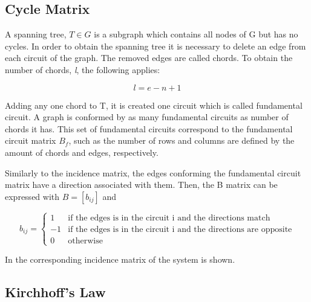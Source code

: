 
\subsection{Cycle Matrix}
\label{CycleSection}
A spanning tree, $T \in G$ is a subgraph which contains all nodes of G but has no cycles. 
In order to obtain the spanning tree it is necessary to delete an edge from each circuit of the graph. The removed edges are called chords. To obtain the number 
of chords, \textit{l}, the following applies:

\begin{equation}
  \label{Numberofchords}
  l = e - n +1
\end{equation}

Adding any one chord to T, it is created one circuit which is called fundamental circuit. A graph is conformed by as many fundamental circuits as number of chords it has.  
This set of fundamental circuits correspond to the fundamental circuit matrix 
$B_f$, such as the number of rows and columns are defined by the amount of chords and edges, respectively. 

Similarly to the incidence matrix, the edges conforming the fundamental circuit 
matrix have a direction associated with them. Then, the B matrix can be 
expressed with $B = [b_{ij}]$ and

\begin{equation}
\label{DiGraphCycle}
 b_{ij} =
		\left\{
		\begin{array}{ll}
		
		1 			&      \text{if the edges is in the circuit i and the directions match}	
\\
		-1                       &     \text{if the edges is in the circuit i and the directions are opposite}
\\

                0                       &      \text{otherwise}

		\end{array}
		\right.
\end{equation}	

In  the corresponding incidence matrix of the system is 
shown.

\subsection{Kirchhoff's Law}
\label{KirchhoffSection}

